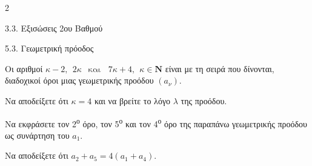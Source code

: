 \begin{ylh}{2}
    \item 3.3. Εξισώσεις 2ου Βαθμού
    \item 5.3. Γεωμετρική πρόοδος
\end{ylh}
Οι αριθμοί $\kappa - 2,\ \ 2\kappa\ \ \text{ και}\text{ }\ 7\kappa + 4,\ \ \kappa \in \mathbf{N}$ είναι με τη σειρά που δίνονται, διαδοχικοί όροι μιας γεωμετρικής προόδου $\left( a_{\nu} \right)$.
\begin{alist}
\item Να αποδείξετε ότι $\kappa = 4$ και να βρείτε το λόγο $\lambda$ της προόδου.
\item

\begin{rlist}
\item
  Να εκφράσετε τον 2\textsuperscript{ο} όρο, τον 5\textsuperscript{ο} και τον 4\textsuperscript{ο} όρο της παραπάνω γεωμετρικής προόδου ως συνάρτηση του $a_{1}$.
\item
  Να αποδείξετε ότι $a_{2} + a_{5} = 4\left( a_{1} + a_{4} \right)$.
\end{rlist}

\end{alist}

